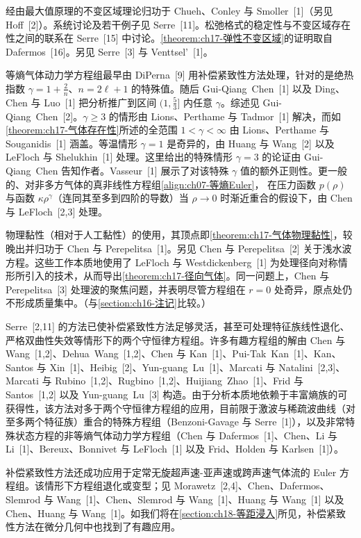 \documentclass[../../main.tex]{subfiles}
\begin{document}
经由最大值原理的不变区域理论归功于 Chueh、Conley 与 Smoller~[1]（另见 Hoff~[2]）。系统讨论及若干例子见 Serre~[11]。松弛格式的稳定性与不变区域存在性之间的联系在 Serre~[15] 中讨论。\cref{theorem:ch17-弹性不变区域}的证明取自 Dafermos~[16]。另见 Serre~[3] 与 Venttsel'~[1]。

等熵气体动力学方程组最早由 DiPerna~[9] 用补偿紧致性方法处理，针对的是绝热指数 $\gamma=1+\frac{2}{n}$、$n=2\ell+1$ 的特殊值。随后 Gui-Qiang~Chen~[1] 以及 Ding、Chen 与 Luo~[1] 把分析推广到区间 $(1,\frac{5}{3}]$ 内任意 $\gamma$。综述见 Gui-Qiang~Chen~[2]。$\gamma\geqslant3$ 的情形由 Lions、Perthame 与 Tadmor~[1] 解决，而如\cref{theorem:ch17-气体存在性}所述的全范围 $1<\gamma<\infty$ 由 Lions、Perthame 与 Souganidis~[1] 涵盖。等温情形 $\gamma=1$ 是奇异的，由 Huang 与 Wang~[2] 以及 LeFloch 与 Shelukhin~[1] 处理。这里给出的特殊情形 $\gamma=3$ 的论证由 Gui-Qiang~Chen 告知作者。Vasseur~[1] 展示了对该特殊 $\gamma$ 值的额外正则性。更一般的、对非多方气体的真非线性方程组\eqref{align:ch07-等熵Euler}，
在压力函数 $p(\rho)$ 与函数 $\kappa\rho^\gamma$（连同其至多到四阶的导数）当 $\rho\to0$ 时渐近重合的假设下，由 Chen 与 LeFloch~[2,3] 处理。

物理黏性（相对于人工黏性）的使用，其顶点即\cref{theorem:ch17-气体物理黏性}，较晚出并归功于 Chen 与 Perepelitsa~[1]。另见 Chen 与 Perepelitsa~[2] 关于浅水波方程。这些工作本质地使用了 LeFloch 与 Westdickenberg~[1] 为处理径向对称情形所引入的技术，从而导出\cref{theorem:ch17-径向气体}。同一问题上，Chen 与 Perepelitsa~[3] 处理波的聚焦问题，并表明尽管方程组在 $r=0$ 处奇异，原点处仍不形成质量集中。（与\cref{section:ch16-注记}比较。）

Serre~[2,11] 的方法已使补偿紧致性方法足够灵活，甚至可处理特征族线性退化、严格双曲性失效等情形下的两个守恒律方程组。许多有趣方程组的解由 Chen 与 Wang~[1,2]、Dehua~Wang~[1,2]、Chen 与 Kan~[1]、Pui-Tak~Kan~[1]、Kan、Santos 与 Xin~[1]、Heibig~[2]、Yun-guang~Lu~[1]、Marcati 与 Natalini~[2,3]、Marcati 与 Rubino~[1,2]、Rugbino~[1,2]、Huijiang~Zhao~[1]、Frid 与 Santos~[1,2] 以及 Yun-guang~Lu~[3] 构造。由于分析本质地依赖于丰富熵族的可获得性，该方法对多于两个守恒律方程组的应用，目前限于激波与稀疏波曲线（对至多两个特征族）重合的特殊方程组（Benzoni-Gavage 与 Serre~[1]），以及非常特殊状态方程的非等熵气体动力学方程组（Chen 与 Dafermos~[1]、Chen、Li 与 Li~[1]、Bereux、Bonnivet 与 LeFloch~[1] 以及 Frid、Holden 与 Karlsen~[1]）。

补偿紧致性方法还成功应用于定常无旋超声速-亚声速或跨声速气体流的 Euler 方程组。该情形下方程组退化或变型；见 Morawetz~[2,4]、Chen、Dafermos、Slemrod 与 Wang~[1]、Chen、Slemrod 与 Wang~[1]、Huang 与 Wang~[1] 以及 Chen、Huang 与 Wang~[1]。如我们将在\cref{section:ch18-等距浸入}所见，补偿紧致性方法在微分几何中也找到了有趣应用。
\end{document}
